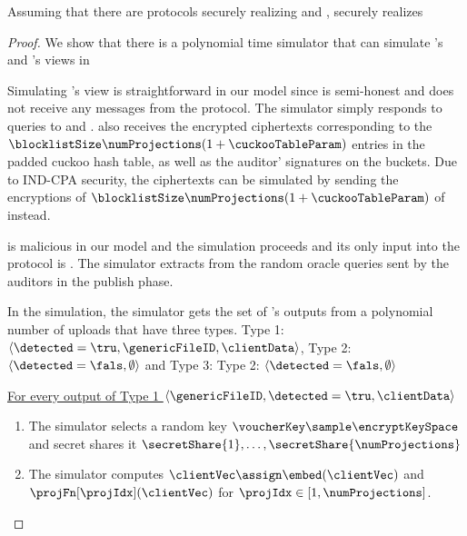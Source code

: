 \begin{theorem}
Assuming that there are protocols securely realizing \distSigningFunc and \authOPRFFunc, \protocolFM securely realizes \contentModFunc \end{theorem}


\begin{proof}

We show that there is a polynomial time simulator that can simulate \client's and \server's views in \protocolEM

%
Simulating \client's view is straightforward in our model since \client is semi-honest and does not receive any messages from the protocol. The simulator simply responds to queries to \primeRO and \ro. \client also receives the encrypted ciphertexts corresponding to the $\blocklistSize \numProjections (1 + \cuckooTableParam)$ entries in the padded cuckoo hash table, as well as the auditor' signatures on the buckets. Due to IND-CPA security, the ciphertexts can be simulated by sending the encryptions of $\blocklistSize \numProjections (1 + \cuckooTableParam)$ of \groupIdentity instead. 






%
\server is malicious in our model and the simulation proceeds and its only input into the protocol is \blocklist. The simulator extracts \blocklist from the random oracle queries sent by the auditors in the publish phase. 


In the simulation, the simulator gets the set of \server's outputs from a polynomial number of uploads that have three types. Type 1: $\langle \detected = \tru, \genericFileID, \clientData \rangle$, Type 2: $\langle \detected = \fals, \emptyset \rangle$ and Type 3: Type 2: $\langle \detected = \fals, \emptyset \rangle$


\smallskip\underline{For every output of Type 1 $\langle \genericFileID, \detected = \tru, \clientData \rangle$}
\begin{enumerate}
\item The simulator selects a random key $\voucherKey \sample \encryptKeySpace$ and secret shares it $\secretShare{1}, \dots, \secretShare{\numProjections}$

\item The simulator computes $\clientVec \assign \embed(\clientVec)$ and $\projFn[\projIdx](\clientVec)$ for $\projIdx \in [1, \numProjections]$. 


\end{enumerate}
\end{proof}

